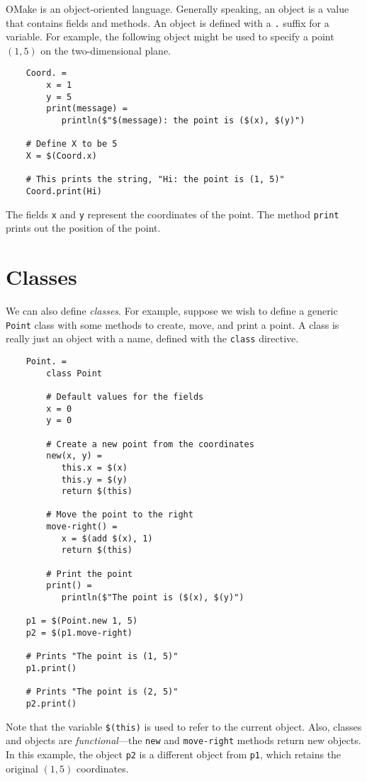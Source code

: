 OMake is an object-oriented language.  Generally speaking, an object is a value that contains fields
and methods.  An object is defined with a \verb+.+ suffix for a variable.  For example, the
following object might be used to specify a point $(1, 5)$ on the two-dimensional plane.

\begin{verbatim}
    Coord. =
        x = 1
        y = 5
        print(message) =
           println($"$(message): the point is ($(x), $(y)")

    # Define X to be 5
    X = $(Coord.x)

    # This prints the string, "Hi: the point is (1, 5)"
    Coord.print(Hi)
\end{verbatim}

The fields \verb+x+ and \verb+y+ represent the coordinates of the point.  The method \verb+print+
prints out the position of the point.

\section{Classes}

We can also define \emph{classes}.  For example, suppose we wish to define a generic \verb+Point+
class with some methods to create, move, and print a point.  A class is really just an object with
a name, defined with the \verb+class+ directive.

\begin{verbatim}
    Point. =
        class Point

        # Default values for the fields
        x = 0
        y = 0

        # Create a new point from the coordinates
        new(x, y) =
           this.x = $(x)
           this.y = $(y)
           return $(this)

        # Move the point to the right
        move-right() =
           x = $(add $(x), 1)
           return $(this)

        # Print the point
        print() =
           println($"The point is ($(x), $(y)")

    p1 = $(Point.new 1, 5)
    p2 = $(p1.move-right)

    # Prints "The point is (1, 5)"
    p1.print()

    # Prints "The point is (2, 5)"
    p2.print()
\end{verbatim}

Note that the variable \verb+$(this)+ is used to refer to the current object.  Also, classes and
objects are \emph{functional}---the \verb+new+ and \verb+move-right+ methods return new objects.  In
this example, the object \verb+p2+ is a different object from \verb+p1+, which retains the original
$(1, 5)$ coordinates.

